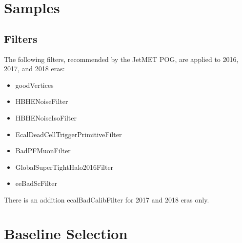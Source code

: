 \section{Samples}\label{Samples}



\subsection{Filters}
The following filters, recommended by the JetMET POG, are applied to 2016, 2017, and 2018 eras:
\begin{itemize}
	\item goodVertices
	\item HBHENoiseFilter
	\item HBHENoiseIsoFilter
	\item EcalDeadCellTriggerPrimitiveFilter
	\item BadPFMuonFilter
	\item GlobalSuperTightHalo2016Filter
	\item eeBadScFilter
\end{itemize}
There is an addition ecalBadCalibFilter for 2017 and 2018 eras only.

\section{Baseline Selection} \label{sec:Baseline}

